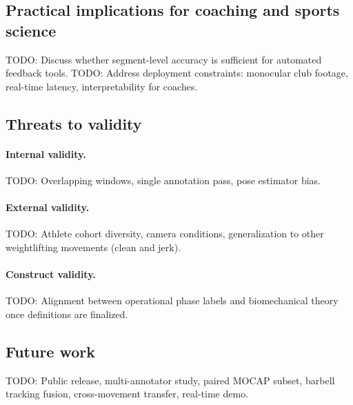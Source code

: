 \subsection{Practical implications for coaching and sports science}
\label{sec:discussion:practice}

\textsc{TODO:} Discuss whether segment-level accuracy is sufficient for automated feedback tools.
\textsc{TODO:} Address deployment constraints: monocular club footage, real-time latency, interpretability for coaches.

\subsection{Threats to validity}
\label{sec:discussion:validity}

\paragraph{Internal validity.}
\textsc{TODO:} Overlapping windows, single annotation pass, pose estimator bias.

\paragraph{External validity.}
\textsc{TODO:} Athlete cohort diversity, camera conditions, generalization to other weightlifting movements (clean and jerk).

\paragraph{Construct validity.}
\textsc{TODO:} Alignment between operational phase labels and biomechanical theory once definitions are finalized.

\subsection{Future work}
\label{sec:discussion:future}

\textsc{TODO:} Public release, multi-annotator study, paired MOCAP subset, barbell tracking fusion, cross-movement transfer, real-time demo.
